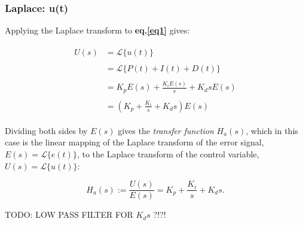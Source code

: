 \documentclass[11pt]{article}
\theoremstyle{definition}
\begin{document}
\subsubsection{Laplace: u(t)}

Applying the Laplace transform to \textbf{eq.\ref{eq1}} gives:

\begin{align*}
\begin{split}
    U(s) &= \mathcal{L}\{u(t)\} \\\\
         &= \mathcal{L}\{P(t) + I(t) + D(t)\} \\\\
         &= K_{p}E(s) + \frac{K_{i}E(s)}{s} + K_{d}sE(s) \\\\
         &= \left(K_{p} + \frac{K_{i}}{s} + K_{d}s\right)E(s)
\end{split}
\end{align*}

Dividing both sides by $E(s)$ gives the \textit{transfer function} $H_{a}(s)$, which in this case is the linear mapping of the Laplace transform of
the error signal, $E(s) = \mathcal{L}\{e(t)\}$, to the Laplace transform of the control variable, $U(s) = \mathcal{L}\{u(t)\}$:

\[ H_{a}(s) := \frac{U(s)}{E(s)} = K_{p} + \frac{K_{i}}{s} + K_{d}s.\] 

TODO: LOW PASS FILTER FOR $K_{d}s$ ?!?!
\end{document}
